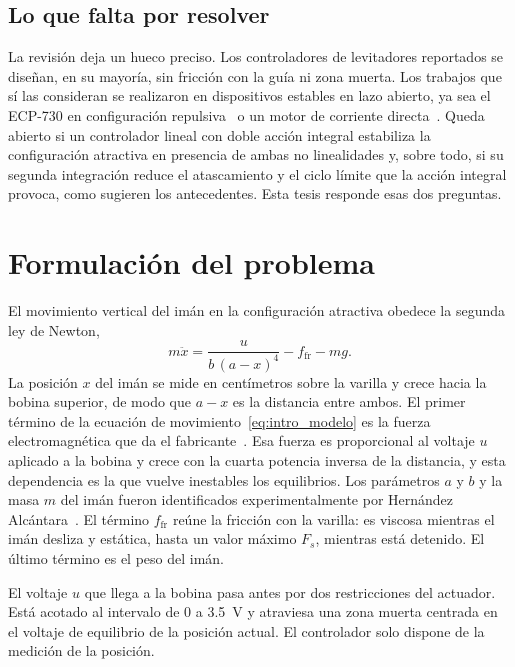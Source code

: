 \subsection{Lo que falta por resolver}

La revisión deja un hueco preciso. Los controladores de levitadores reportados se diseñan, en su mayoría, sin fricción con la guía ni zona muerta. Los trabajos que sí las consideran se realizaron en dispositivos estables en lazo abierto, ya sea el ECP-730 en configuración repulsiva~\cite{diana_tesis,alcantara} o un motor de corriente directa~\cite{perez}. Queda abierto si un controlador lineal con doble acción integral estabiliza la configuración atractiva en presencia de ambas no linealidades y, sobre todo, si su segunda integración reduce el atascamiento y el ciclo límite que la acción integral provoca, como sugieren los antecedentes. Esta tesis responde esas dos preguntas.

\section{Formulación del problema}

El movimiento vertical del imán en la configuración atractiva obedece la segunda ley de Newton,
\begin{equation}
m\ddot{x} = \frac{u}{b\,(a-x)^4} - f_{\text{fr}} - mg .
\label{eq:intro_modelo}
\end{equation}
La posición $x$ del imán se mide en centímetros sobre la varilla y crece hacia la bobina superior, de modo que $a-x$ es la distancia entre ambos. El primer término de la ecuación de movimiento~\eqref{eq:intro_modelo} es la fuerza electromagnética que da el fabricante~\cite{parks}. Esa fuerza es proporcional al voltaje $u$ aplicado a la bobina y crece con la cuarta potencia inversa de la distancia, y esta dependencia es la que vuelve inestables los equilibrios. Los parámetros $a$ y $b$ y la masa $m$ del imán fueron identificados experimentalmente por Hernández Alcántara~\cite{diana_tesis}. El término $f_{\text{fr}}$ reúne la fricción con la varilla: es viscosa mientras el imán desliza y estática, hasta un valor máximo $F_s$, mientras está detenido. El último término es el peso del imán.

El voltaje $u$ que llega a la bobina pasa antes por dos restricciones del actuador. Está acotado al intervalo de 0 a 3.5~V y atraviesa una zona muerta centrada en el voltaje de equilibrio de la posición actual. El controlador solo dispone de la medición de la posición.

